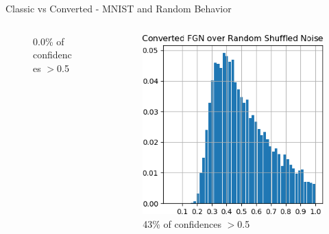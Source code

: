 \documentclass{beamer}
\begin{document}
\begin{frame}{Classic vs Converted - MNIST and Random Behavior}
\begin{columns}
\begin{column}{.33\textwidth}
\begin{figure}
        \centering \tiny{0.0\% of confidences $>$0.5}
    \end{figure}
    \end{column}
    \begin{column}{.33\textwidth}
    \begin{figure}
        \centering
        \includegraphics[width=.91\textwidth]{images/mnist-behavior/converted-hist-shuffled.png}
        \centering \tiny{43\% of confidences $>$0.5}
    \end{figure}
    \end{column}
    \end{columns}
    
    
\end{frame}
\end{document}
